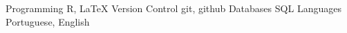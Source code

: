 \begin{cvskills}
  \cvskill
    {Programming}
    {R, LaTeX}
  \cvskill
    {Version Control}
    {git, github}
   \cvskill
    {Databases}
    {SQL}
  \cvskill
    {Languages}
    {Portuguese, English}
\end{cvskills}

